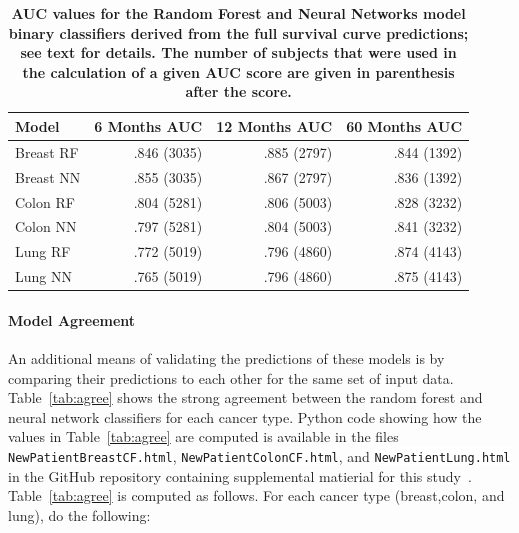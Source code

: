 \documentclass[10pt,letterpaper]{article}
\newcommand{\codewhite}[1]{\colorbox{white}{\texttt{#1}}}
\begin{document}
\begin{table}[!ht]
\begin{adjustwidth}{-2.25in}{0in} %
\caption{\label{tab:AUC} {\bf AUC values for the Random Forest and Neural Networks model
binary classifiers derived from the full survival curve predictions; see text for details. The number of subjects that were used in the calculation of a given AUC score are given in parenthesis after the score. }}
\begin{tabular}{lrrr}
\toprule
Model & 6 Months AUC & 12 Months AUC & 60 Months AUC \\ 
\midrule
Breast RF &  .846  (3035)     &     .885  (2797)         &  .844 (1392) \\ 
Breast NN &   .855 (3035)    &     .867  (2797)    &    .836  (1392) \\ 
Colon RF  &     .804 (5281)         &      .806 (5003)          &      .828   (3232)        \\ 
Colon NN   &     .797 (5281)         &          .804 (5003)        &   .841 (3232) \\ 
Lung RF    &      .772  (5019)             &        .796 (4860)              &   .874 (4143)  \\ 
Lung NN    &        .765  (5019)            &        .796  (4860)             &  .875 (4143)  \\
\bottomrule
\end{tabular}
\end{adjustwidth}
\end{table}




\paragraph{Model Agreement}
An additional means of validating the predictions of these models is by comparing their predictions to each other for the same set of input data. 
Table~\ref{tab:agree} shows the strong agreement between the random forest and neural network classifiers for each cancer type. Python code showing how the values in Table~\ref{tab:agree} are computed is available in the files 
\codewhite{NewPatientBreastCF.html}, \codewhite{NewPatientColonCF.html}, and \codewhite{NewPatientLung.html} in the GitHub repository containing supplemental matierial for this study~\cite{supp}. Table~\ref{tab:agree} is computed as follows. 
For each cancer type (breast,colon, and lung), do the following:
\end{document}
